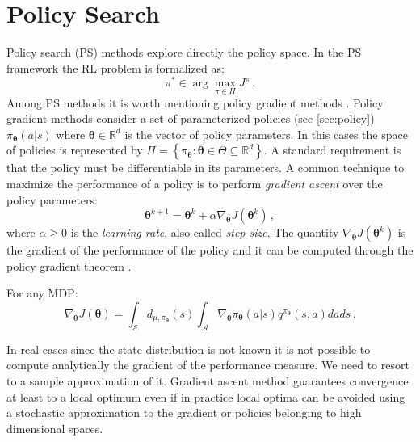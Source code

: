 \section{Policy Search}\label{sec:policy-search}
Policy search (PS) methods explore directly the policy space. In the PS framework the RL problem is formalized as:
\begin{equation}
	\pi^* \in \arg \max_{\pi \in \Pi} J^\pi \, .
\end{equation}
Among PS methods it is worth mentioning policy gradient methods \citep{pol_grad_func_approx, PETERS2008682}. Policy gradient methods consider a set of parameterized policies (see \cref{sec:policy}) $\pi_{\boldsymbol{\theta}}(a|s)$ where $\boldsymbol{\theta} \in \mathbb{R}^d$ is the vector of policy parameters. In this cases the space of policies is represented by $\Pi = \left\{ \pi_{\boldsymbol{\theta}} : \boldsymbol{\theta} \in \Theta \subseteq \mathbb{R}^d \right\}$.  A standard requirement is that the policy must be differentiable in its parameters.
A common technique to maximize the performance of a policy is to perform \textit{gradient ascent} over the policy parameters:
\begin{equation}
	\boldsymbol{\theta}^{k+1} = \boldsymbol{\theta}^k + \alpha \nabla_{\boldsymbol{\theta}} J(\boldsymbol{\theta}^k) \, ,
	\label{eq:theta-update}
\end{equation}
where $\alpha \geq 0$ is the \textit{learning rate}, also called \textit{step size}. The quantity $\nabla_{\boldsymbol{\theta}} J(\boldsymbol{\theta}^k)$ is the gradient of the performance of the policy and it can be computed through the policy gradient theorem \citep{pol_grad_func_approx}.
\begin{theorem} For any MDP:
\begin{equation}
	\nabla_{\boldsymbol{\theta}} J(\boldsymbol{\theta}) = \int_\mathcal{S} d_{\mu, \pi_{\boldsymbol{\theta}}}(s)\int_\mathcal{A} \nabla_{\boldsymbol{\theta}}\pi_{\boldsymbol{\theta}}(a | s) q^{\pi_{\boldsymbol{\theta}}}(s,a) da ds \,.
\label{eq:pol-grad}
\end{equation}
\end{theorem} 
In real cases since the state distribution is not known it is not possible to compute analytically the gradient of the performance measure. We need to resort to a sample approximation of it. 
Gradient ascent method guarantees convergence at least to a local optimum even if in practice local optima can be avoided using a stochastic approximation to the gradient or policies belonging to high dimensional spaces.


